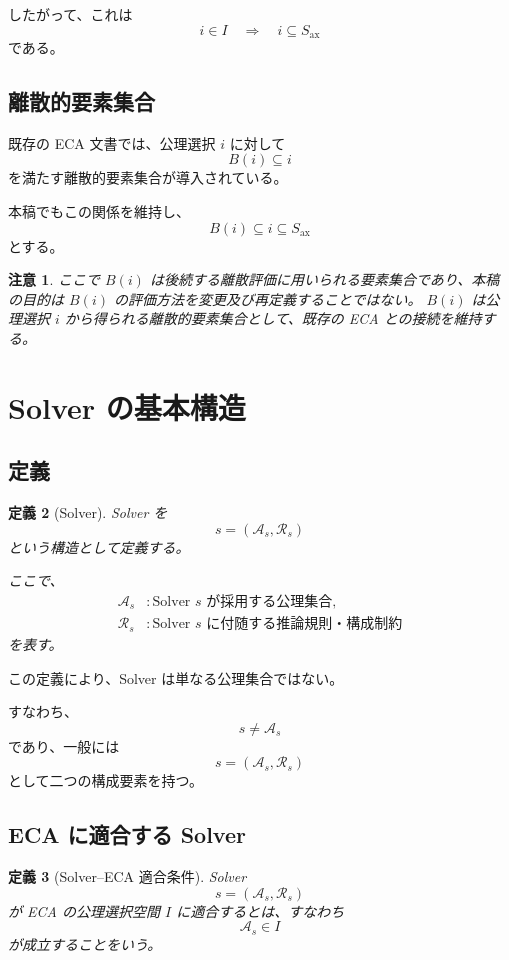 \documentclass[a4paper,11pt]{jsarticle}
\newtheorem{definition}{定義}[section]
\newtheorem{remark}[definition]{注意}
\newcommand{\Ax}{S_{\mathrm{ax}}}
\newcommand{\Sel}{I}
\begin{document}
したがって、これは
\[
i\in\Sel
\quad\Longrightarrow\quad
i\subseteq\Ax
\]
である。

\subsection{離散的要素集合}

既存の ECA 文書では、公理選択 $i$ に対して
\[
B(i)\subseteq i
\]
を満たす離散的要素集合が導入されている。

本稿でもこの関係を維持し、
\[
\boxed{B(i)\subseteq i\subseteq\Ax}
\]
とする。

\begin{remark}
ここで $B(i)$ は後続する離散評価に用いられる要素集合であり、本稿の目的は $B(i)$ の評価方法を変更及び再定義することではない。
$B(i)$ は公理選択 $i$ から得られる離散的要素集合として、既存の ECA との接続を維持する。
\end{remark}

\section{Solver の基本構造}

\subsection{定義}

\begin{definition}[Solver]
Solver を
\[
\boxed{
s=(\mathcal{A}_s,\mathcal{R}_s)
}
\]
という構造として定義する。

ここで、
\begin{align}
\mathcal{A}_s &: \text{Solver $s$ が採用する公理集合},\\
\mathcal{R}_s &: \text{Solver $s$ に付随する推論規則・構成制約}
\end{align}
を表す。
\end{definition}

この定義により、Solver は単なる公理集合ではない。

すなわち、
\[
s\neq\mathcal{A}_s
\]
であり、一般には
\[
s=(\mathcal{A}_s,\mathcal{R}_s)
\]
として二つの構成要素を持つ。

\subsection{ECA に適合する Solver}

\begin{definition}[Solver--ECA 適合条件]
Solver
\[
s=(\mathcal{A}_s,\mathcal{R}_s)
\]
が ECA の公理選択空間 $\Sel$ に適合するとは、すなわち
\[
\boxed{
\mathcal{A}_s\in\Sel
}
\]
が成立することをいう。
\end{definition}
\end{document}
